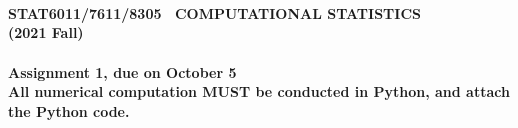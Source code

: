 \documentclass[notitlepage,a4paper,12pt]{article}%
\begin{document}
\begin{center}
\textbf{}\\
\textbf{}\\
\par
\ \\
\textbf{STAT6011/7611/8305 \ COMPUTATIONAL STATISTICS}\\
\textbf{(2021 Fall)}\\
\ \\
\textbf{Assignment 1, due on October 5}\\

\vspace{0.2in}
\textbf{All numerical computation MUST be conducted in Python, and attach the
Python code.}
\end{center}
\end{document}
